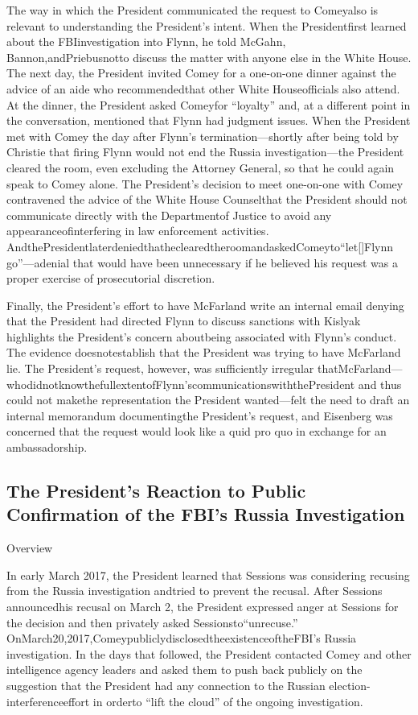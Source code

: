 The way in which the President communicated the request to Comeyalso is relevant to understanding the President’s intent.
When the Presidentfirst learned about the FBIinvestigation into Flynn, he told McGahn, Bannon,andPriebusnotto discuss the matter with anyone else in the White House.
The next day, the President invited Comey for a one-on-one dinner against the advice of an aide who recommendedthat other White Houseofficials also attend.
At the dinner, the President asked Comeyfor “loyalty” and, at a different point in the conversation, mentioned that Flynn had judgment issues.
When the President met with Comey the day after Flynn’s termination—shortly after being told by Christie that firing Flynn would not end the Russia investigation—the President cleared the room, even excluding the Attorney General, so that he could again speak to Comey alone.
The President’s decision to meet one-on-one with Comey contravened the advice of the White House Counselthat the President should not communicate directly with the Departmentof Justice to avoid any appearanceofinterfering in law enforcement activities.
AndthePresidentlaterdeniedthatheclearedtheroomandaskedComeyto“let[]Flynn go”—adenial that would have been unnecessary if he believed his request was a proper exercise of prosecutorial discretion.

Finally, the President’s effort to have McFarland write an internal email denying that the President had directed Flynn to discuss sanctions with Kislyak highlights the President’s concern aboutbeing associated with Flynn’s conduct.
The evidence doesnotestablish that the President was trying to have McFarland lie.
The President’s request, however, was sufficiently irregular thatMcFarland—whodidnotknowthefullextentofFlynn’scommunicationswiththePresident and thus could not makethe representation the President wanted—felt the need to draft an internal memorandum documentingthe President’s request, and Eisenberg was concerned that the request would look like a quid pro quo in exchange for an ambassadorship.

\subsection{The President's Reaction to Public Confirmation of the FBI's Russia Investigation}

Overview

In early March 2017, the President learned that Sessions was considering recusing from the Russia investigation andtried to prevent the recusal.
After Sessions announcedhis recusal on March 2, the President expressed anger at Sessions for the decision and then privately asked Sessionsto“unrecuse.”
OnMarch20,2017,ComeypubliclydisclosedtheexistenceoftheFBI’s Russia investigation.
In the days that followed, the President contacted Comey and other intelligence agency leaders and asked them to push back publicly on the suggestion that the President had any connection to the Russian election-interferenceeffort in orderto “lift the cloud” of the ongoing investigation.

